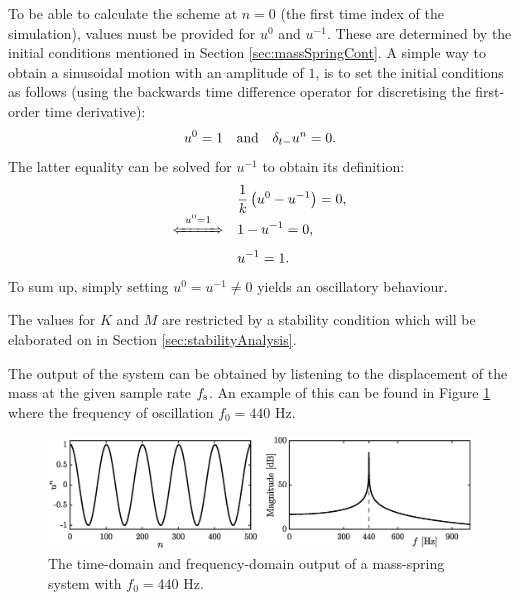 To be able to calculate the scheme at $n=0$ (the first time index of the simulation), values must be provided for $u^0$ and $u^{-1}$. These are determined by the initial conditions mentioned in Section \ref{sec:massSpringCont}. A simple way to obtain a sinusoidal motion with an amplitude of $1$, is to set the initial conditions as follows (using the backwards time difference operator for discretising the first-order time derivative): 
%
\begin{equation}
    u^0 = 1 \quad \text{and} \quad \delta_{t-} u^n = 0.
\end{equation}
The latter equality can be solved for $u^{-1}$ to obtain its definition: 
\begin{align*}
    &\frac{1}{k}\left(u^0 - u^{-1}\right) = 0,\\[-1em]
    \xLeftrightarrow{\mystrut\ u^0 = 1\ }\quad &1 - u^{-1} = 0,\\[0.1em]
 &u^{-1} = 1.
\end{align*}
To sum up, simply setting $u^0 = u^{-1} \neq 0$  yields an oscillatory behaviour. 

The values for $K$ and $M$ are restricted by a stability condition which will be elaborated on in Section \ref{sec:stabilityAnalysis}.

The output of the system can be obtained by listening to the displacement of the mass at the given sample rate $f_\text{s}$. An example of this can be found in Figure \ref{fig:massSpringOutput} where the frequency of oscillation $f_0 = 440$ Hz.

\begin{figure}[ht]
    \includegraphics[width=\textwidth]{figures/fdtd/massSpringOutput.eps}
    \caption{The time-domain and frequency-domain output of a mass-spring system with $f_0 = 440$ Hz. \label{fig:massSpringOutput}}
\end{figure}



